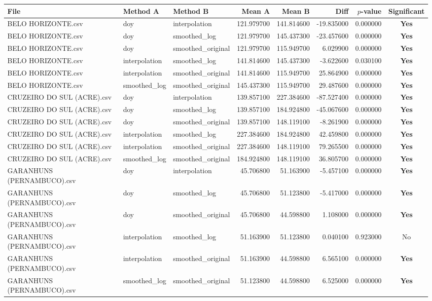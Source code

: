 \begin{tabular}{lllrrrrc}
\toprule
File & Method A & Method B & Mean A & Mean B & Diff & $p$-value & Significant \\
\midrule
BELO HORIZONTE.csv & doy & interpolation & 121.979700 & 141.814600 & -19.835000 & 0.000000 & \textbf{Yes} \\
BELO HORIZONTE.csv & doy & smoothed_log & 121.979700 & 145.437300 & -23.457600 & 0.000000 & \textbf{Yes} \\
BELO HORIZONTE.csv & doy & smoothed_original & 121.979700 & 115.949700 & 6.029900 & 0.000000 & \textbf{Yes} \\
BELO HORIZONTE.csv & interpolation & smoothed_log & 141.814600 & 145.437300 & -3.622600 & 0.030100 & \textbf{Yes} \\
BELO HORIZONTE.csv & interpolation & smoothed_original & 141.814600 & 115.949700 & 25.864900 & 0.000000 & \textbf{Yes} \\
BELO HORIZONTE.csv & smoothed_log & smoothed_original & 145.437300 & 115.949700 & 29.487600 & 0.000000 & \textbf{Yes} \\
CRUZEIRO DO SUL (ACRE).csv & doy & interpolation & 139.857100 & 227.384600 & -87.527400 & 0.000000 & \textbf{Yes} \\
CRUZEIRO DO SUL (ACRE).csv & doy & smoothed_log & 139.857100 & 184.924800 & -45.067600 & 0.000000 & \textbf{Yes} \\
CRUZEIRO DO SUL (ACRE).csv & doy & smoothed_original & 139.857100 & 148.119100 & -8.261900 & 0.000000 & \textbf{Yes} \\
CRUZEIRO DO SUL (ACRE).csv & interpolation & smoothed_log & 227.384600 & 184.924800 & 42.459800 & 0.000000 & \textbf{Yes} \\
CRUZEIRO DO SUL (ACRE).csv & interpolation & smoothed_original & 227.384600 & 148.119100 & 79.265500 & 0.000000 & \textbf{Yes} \\
CRUZEIRO DO SUL (ACRE).csv & smoothed_log & smoothed_original & 184.924800 & 148.119100 & 36.805700 & 0.000000 & \textbf{Yes} \\
GARANHUNS (PERNAMBUCO).csv & doy & interpolation & 45.706800 & 51.163900 & -5.457100 & 0.000000 & \textbf{Yes} \\
GARANHUNS (PERNAMBUCO).csv & doy & smoothed_log & 45.706800 & 51.123800 & -5.417000 & 0.000000 & \textbf{Yes} \\
GARANHUNS (PERNAMBUCO).csv & doy & smoothed_original & 45.706800 & 44.598800 & 1.108000 & 0.000000 & \textbf{Yes} \\
GARANHUNS (PERNAMBUCO).csv & interpolation & smoothed_log & 51.163900 & 51.123800 & 0.040100 & 0.923000 & No \\
GARANHUNS (PERNAMBUCO).csv & interpolation & smoothed_original & 51.163900 & 44.598800 & 6.565100 & 0.000000 & \textbf{Yes} \\
GARANHUNS (PERNAMBUCO).csv & smoothed_log & smoothed_original & 51.123800 & 44.598800 & 6.525000 & 0.000000 & \textbf{Yes} \\
\bottomrule
\end{tabular}
